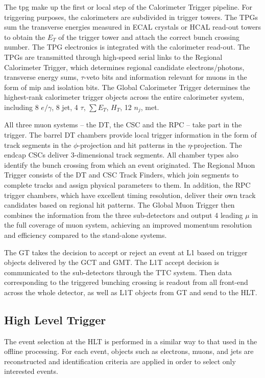 The \acrfull{tpg} make up the first or local step of the Calorimeter Trigger pipeline. For triggering purposes, the calorimeters are subdivided in trigger towers. The TPGs sum the transverse energies measured in ECAL crystals or HCAL read-out towers to obtain the $E_T$ of the trigger tower and attach the correct bunch crossing number. The TPG electronics is integrated with the calorimeter read-out. The TPGs are transmitted through high-speed serial links to the Regional Calorimeter Trigger, which determines regional candidate electrons/photons, transverse energy sums, $\tau$-veto bits and information relevant for muons in the form of \acrfull{mip} and isolation bits. The Global Calorimeter Trigger determines the highest-rank calorimeter trigger objects across the entire calorimeter system, including 8 $e/\gamma$, 8 jet, 4 $\tau$, $\sum E_T$, $H_T$, 12 $n_j$, met.

All three muon systems – the DT, the CSC and the RPC – take part in the trigger. The barrel DT chambers provide local trigger information in the form of track segments in the $\phi$-projection and hit patterns in the $\eta$-projection. The endcap CSCs deliver 3-dimensional track segments. All chamber types also identify the bunch crossing from which an event originated. The Regional Muon Trigger consists of the DT and CSC Track Finders, which join segments to complete tracks and assign physical parameters to them. In addition, the RPC trigger chambers, which have excellent timing resolution, deliver their own track candidates based on regional hit patterns. The Global Muon Trigger then combines the information from the three sub-detectors and output 4 leading $\mu$ in the full coverage of muon system, achieving an improved momentum resolution and efficiency compared to the stand-alone systems.

The GT takes the decision to accept or reject an event at L1 based on trigger objects delivered by the GCT and GMT. The L1T accept decision is communicated to the sub-detectors through the TTC system. Then data corresponding to the triggered bunching crossing is readout from all front-end across the whole detector, as well as L1T objects from GT and send to the HLT.



\subsection{High Level Trigger}

The event selection at the HLT is performed in a similar way to that used in the offline processing. For each event, objects such as electrons, muons, and jets are reconstructed and identification criteria are applied in order to select only interested events.

